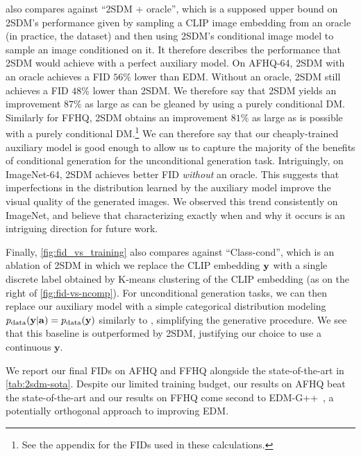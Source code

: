  also compares against ``2SDM + oracle'', which is a supposed upper bound on 2SDM's performance given by sampling a CLIP image embedding from an oracle (in practice, the dataset) and then using 2SDM's conditional image model to sample an image conditioned on it. It therefore describes the performance that 2SDM would achieve with a perfect auxiliary model. On AFHQ-64, 2SDM with an oracle achieves a FID $56\%$ lower than EDM. Without an oracle, 2SDM still achieves a FID $48\%$ lower than 2SDM. We therefore say that 2SDM yields an improvement $87\%$ as large as can be gleaned by using a purely conditional DM. Similarly for FFHQ, 2SDM obtains an improvement $81\%$ as large as is possible with a purely conditional DM.\footnote{See the appendix for the FIDs used in these calculations.} We can therefore say that our cheaply-trained auxiliary model is good enough to allow us to capture the majority of the benefits of conditional generation for the unconditional generation task. Intriguingly,
 on ImageNet-64, 2SDM achieves better FID \textit{without} an oracle. This suggests that imperfections in the distribution
learned by the auxiliary model improve the visual quality of the generated images. We observed this trend consistently on ImageNet, and believe that characterizing exactly when and why it occurs is an intriguing direction for future work.

Finally, \cref{fig:fid_vs_training} also compares against ``Class-cond'', which is an ablation of 2SDM in which we replace the CLIP embedding ${\mathbf{y}}$ with a single discrete label obtained by K-means clustering of the CLIP embedding (as on the right of \cref{fig:fid-vs-ncomp}). For unconditional generation tasks, we can then replace our auxiliary model with a simple categorical distribution modeling $p_{\rm{data}}({\mathbf{y}}|{\mathbf{a}})=p_{\rm{data}}({\mathbf{y}})$ similarly to \citet{hu2022self}, simplifying the generative procedure. We see that this baseline is outperformed by 2SDM, justifying our choice to use a continuous $\mathbf{y}$.

We report our final FIDs on AFHQ and FFHQ alongside the state-of-the-art in \cref{tab:2sdm-sota}. Despite our limited training budget, our results on AFHQ beat the state-of-the-art and our results on FFHQ come second to EDM-G++~\citep{kim2022refining}, a potentially orthogonal approach to improving EDM.

